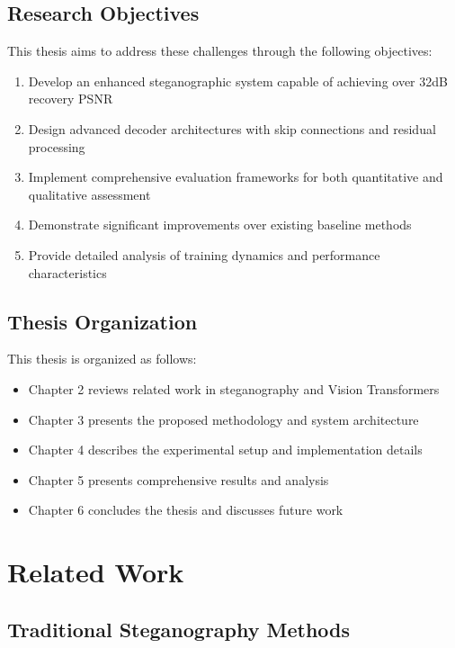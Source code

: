 \documentclass[12pt,a4paper]{report}
\begin{document}
\section{Research Objectives}

This thesis aims to address these challenges through the following objectives:

\begin{enumerate}
    \item Develop an enhanced steganographic system capable of achieving over 32dB recovery PSNR
    \item Design advanced decoder architectures with skip connections and residual processing
    \item Implement comprehensive evaluation frameworks for both quantitative and qualitative assessment
    \item Demonstrate significant improvements over existing baseline methods
    \item Provide detailed analysis of training dynamics and performance characteristics
\end{enumerate}

\section{Thesis Organization}

This thesis is organized as follows:

\begin{itemize}
    \item Chapter 2 reviews related work in steganography and Vision Transformers
    \item Chapter 3 presents the proposed methodology and system architecture
    \item Chapter 4 describes the experimental setup and implementation details
    \item Chapter 5 presents comprehensive results and analysis
    \item Chapter 6 concludes the thesis and discusses future work
\end{itemize}

\chapter{Related Work}
\label{ch:related_work}

\section{Traditional Steganography Methods}
\end{document}
